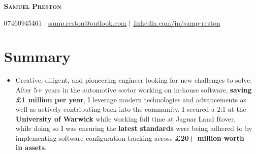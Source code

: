 \documentclass[letterpaper,11pt]{article}
\newcommand{\resumeItem}[1]{
  \item\small{
    {#1 \vspace{-2pt}}
  }
}
\newcommand{\resumeSubHeadingListStart}{\begin{itemize}[leftmargin=0.15in, label={}]}
\newcommand{\resumeSubHeadingListEnd}{\end{itemize}}
\begin{document}
\begin{center}
    \textbf{\Huge \scshape Samuel Preston}
\end{center}

\begin{center}
\small 07460945461 $|$
\href{mailto:samp.reston@outlook.com}{\underline{samp.reston@outlook.com}} $|$
\href{https://www.linkedin.com/in/samp-reston/}{\underline{linkedin.com/in/samp-reston}} 
\end{center}


\section{Summary}
  \resumeSubHeadingListStart
    \resumeItem{Creative, diligent, and pioneering engineer looking for new challenges to solve. After 5+ years in the automotive sector working on in-house software, \textbf{saving £1 million per year}, I leverage modern technologies and advancements as well as actively contributing back into the community. I secured a 2:1 at the \textbf{University of Warwick} while working full time at Jaguar Land Rover, while doing so I was ensuring the \textbf{latest standards} were being adhered to by implementing software configuration tracking across \textbf{£20+ million worth in assets}.}
  \resumeSubHeadingListEnd

\end{document}
